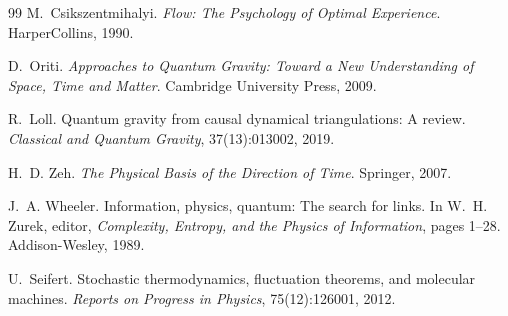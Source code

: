 \documentclass[12pt]{article}
\begin{document}
\begin{thebibliography}{99}
M.~Csikszentmihalyi.
\newblock \emph{Flow: The Psychology of Optimal Experience}.
\newblock HarperCollins, 1990.

D.~Oriti.
\newblock \emph{Approaches to Quantum Gravity: Toward a New Understanding of Space, Time and Matter}.
\newblock Cambridge University Press, 2009.

R.~Loll.
\newblock Quantum gravity from causal dynamical triangulations: A review.
\newblock \emph{Classical and Quantum Gravity}, 37(13):013002, 2019.

H.~D. Zeh.
\newblock \emph{The Physical Basis of the Direction of Time}.
\newblock Springer, 2007.

J.~A. Wheeler.
\newblock Information, physics, quantum: The search for links.
\newblock In W.~H. Zurek, editor, \emph{Complexity, Entropy, and the Physics of Information}, pages 1--28. Addison-Wesley, 1989.

U.~Seifert.
\newblock Stochastic thermodynamics, fluctuation theorems, and molecular machines.
\newblock \emph{Reports on Progress in Physics}, 75(12):126001, 2012.

\end{thebibliography}
\end{document}
